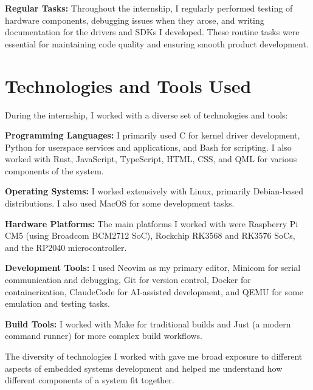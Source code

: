 \documentclass[12pt,a4paper]{report}
\begin{document}
\vspace{0.3cm}

\textbf{Regular Tasks:} Throughout the internship, I regularly performed testing of hardware components, debugging issues when they arose, and writing documentation for the drivers and SDKs I developed. These routine tasks were essential for maintaining code quality and ensuring smooth product development.

\section{Technologies and Tools Used}

During the internship, I worked with a diverse set of technologies and tools:

\vspace{0.3cm}

\textbf{Programming Languages:} I primarily used C for kernel driver development, Python for userspace services and applications, and Bash for scripting. I also worked with Rust, JavaScript, TypeScript, HTML, CSS, and QML for various components of the system.

\vspace{0.3cm}

\textbf{Operating Systems:} I worked extensively with Linux, primarily Debian-based distributions. I also used MacOS for some development tasks.

\vspace{0.3cm}

\textbf{Hardware Platforms:} The main platforms I worked with were Raspberry Pi CM5 (using Broadcom BCM2712 SoC), Rockchip RK3568 and RK3576 SoCs, and the RP2040 microcontroller.

\vspace{0.3cm}

\textbf{Development Tools:} I used Neovim as my primary editor, Minicom for serial communication and debugging, Git for version control, Docker for containerization, ClaudeCode for AI-assisted development, and QEMU for some emulation and testing tasks.

\vspace{0.3cm}

\textbf{Build Tools:} I worked with Make for traditional builds and Just (a modern command runner) for more complex build workflows.

\vspace{0.3cm}

The diversity of technologies I worked with gave me broad exposure to different aspects of embedded systems development and helped me understand how different components of a system fit together.
\end{document}
